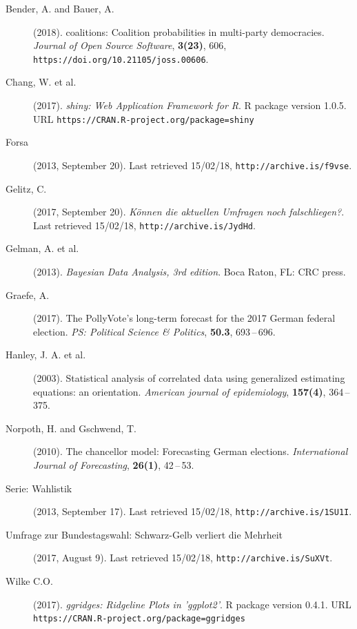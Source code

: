 \documentclass[twoside]{report}
\begin{document}




\begin{description}
\item[Bender, A. and Bauer, A.] (2018).
     coalitions: Coalition probabilities in multi-party democracies.
     {\it Journal of Open Source Software}, {\bf 3(23)},
     606, \texttt{https://doi.org/10.21105/joss.00606}.
\item[Chang, W. et al.] (2017).
     {\it shiny: Web Application Framework for R}.
     R package version 1.0.5.
     URL \texttt{https://CRAN.R-project.org/package=shiny}
\item[Forsa] (2013, September 20).
     Last retrieved 15/02/18, \texttt{http://archive.is/\allowbreak f9vse}.
\item[Gelitz, C.] (2017, September 20).
     {\it K\"{o}nnen die aktuellen Umfragen noch falsch\-liegen?}.
     Last retrieved 15/02/18, \texttt{http://archive.is/JydHd}.
\item[Gelman, A. et al.] (2013).
     {\it Bayesian Data Analysis, 3rd edition}.
     Boca Raton, FL: CRC press.
\item[Graefe, A.] (2017).
     The PollyVote's long-term forecast for the 2017 German federal election.
     {\it PS: Political Science \& Politics}, {\bf 50.3},
     693\,--\,696.
\item[Hanley, J. A. et al.] (2003).
     Statistical analysis of correlated data using generalized estimating equations: an orientation.
     {\it American journal of epidemiology}, {\bf 157(4)},
     364\,--\,375.
\item[Norpoth, H. and Gschwend, T.] (2010).
     The chancellor model: Forecasting German elections.
     {\it International Journal of Forecasting}, {\bf 26(1)},
     42\,--\,53.
\item[Serie: Wahlistik] (2013, September 17).
     Last retrieved 15/02/18, \texttt{http://\allowbreak archive.is/1SU1I}.
\item[Umfrage zur Bundestagswahl: Schwarz-Gelb verliert die Mehrheit] (2017, August 9).
     Last retrieved 15/02/18, \texttt{http://archive.is/SuXVt}.
\item[Wilke C.O.] (2017).
     {\it ggridges: Ridgeline Plots in 'ggplot2'}.
     R package version 0.4.1.
     URL \texttt{https://CRAN.R-project.org/package=ggridges}
\end{description}
\end{document}

